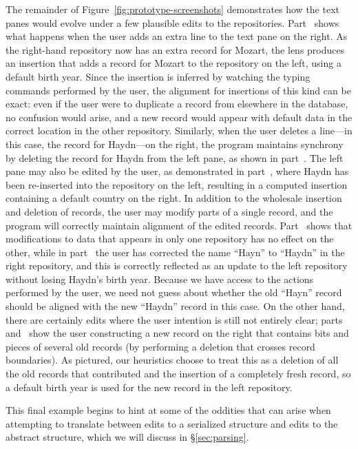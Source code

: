 The remainder of Figure~\ref{fig:prototype-screenshots} demonstrates how the
text panes would evolve under a few plausible edits to the repositories.
Part~ shows what happens when the user adds an
extra line to the text pane on the right. As the right-hand repository now
has an extra record for Mozart, the lens produces an insertion that adds a
record for Mozart to the repository on the left, using a default birth year.
Since the insertion is inferred by watching the typing commands performed by
the user, the alignment for insertions of this kind can be exact: even if
the user were to duplicate a record from elsewhere in the database, no
confusion would arise, and a new record would appear with default data in
the correct location in the other repository. Similarly, when the user
deletes a line---in this case, the record for Haydn---on the right, the
program maintains synchrony by deleting the record for Haydn from the left
pane, as shown in part~. The left pane may also
be edited by the user, as demonstrated in part~,
where Haydn has been re-inserted into the repository on the left, resulting
in a computed insertion containing a default country on the right. In
addition to the wholesale insertion and deletion of records, the user may
modify parts of a single record, and the program will correctly maintain
alignment of the edited records. Part~ shows that
modifications to data that appears in only one repository has no effect on
the other, while in part~ the user has corrected
the name ``Hayn'' to ``Haydn'' in the right repository, and this is
correctly reflected as an update to the left repository without losing
Haydn's birth year. Because we have access to the actions performed by the
user, we need not guess about whether the old ``Hayn'' record should be
aligned with the new ``Haydn'' record in this case. On the other hand, there
are certainly edits where the user intention is still not entirely clear;
parts~ and~ show the
user constructing a new record on the right that contains bits and pieces of
several old records (by performing a deletion that crosses record
boundaries). As pictured, our heuristics choose to treat this as a deletion
of all the old records that contributed and the insertion of a completely
fresh record, so a default birth year is used for the new record in the left
repository.

This final example begins to hint at some of the oddities that can arise
when attempting to translate between edits to a serialized structure and
edits to the abstract structure, which we will discuss in
\S\ref{sec:parsing}.

